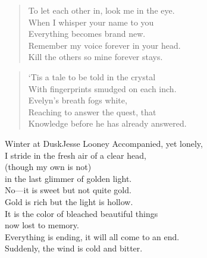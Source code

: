 \vfill

\clearpage

\settowidth{\versewidth}{To let each other in, look me in the eye.}
\hfill\begin{minipage}{\versewidth + \vleftmargin + 30pt}
\begin{verse}
    To let each other in, look me in the eye.\\
    When I whisper your name to you\\
    Everything becomes brand new.\\
    Remember my voice forever in your head.\\
    Kill the others so mine forever stays.\\
\end{verse}
\end{minipage}

\vfill

\begin{verse}
    `Tis a tale to be told in the crystal\\
    With fingerprints smudged on each inch.\\
    Evelyn's breath fogs white,\\
    Reaching to answer the quest, that\\
    Knowledge before he has already answered.\\
\end{verse}

\vfill

\clearpage

\begin{poetry}{Winter at Dusk}{Jesse Looney}
Accompanied, yet lonely,\\
I stride in the fresh air of a clear head,\\
(though my own is not)\\
in the last glimmer of golden light.\\
No—it is sweet but not quite gold.\\
Gold is rich but the light is hollow.\\
It is the color of bleached beautiful things\\
now lost to memory.\\
Everything is ending, it will all come to an end.\\
Suddenly, the wind is cold and bitter.
\end{poetry}


